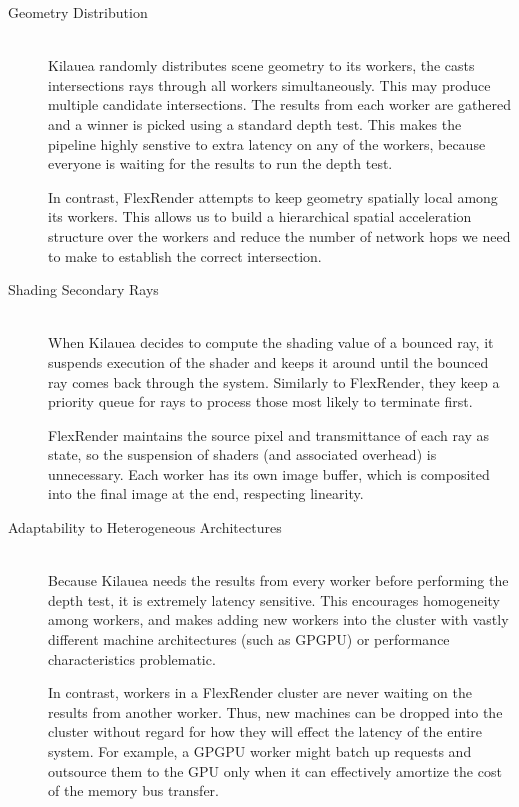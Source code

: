 \documentclass[12pt]{ucthesis}
\begin{document}
\begin{description}
    \item[Geometry Distribution] \hfill \\
        Kilauea randomly distributes scene geometry to
        its workers, the casts intersections rays through all workers
        simultaneously. This may produce multiple candidate intersections. The
        results from each worker are gathered and a winner is picked using a
        standard depth test. This makes the pipeline highly senstive to extra
        latency on any of the workers, because everyone is waiting for the
        results to run the depth test.

        In contrast, FlexRender attempts to keep geometry spatially local among
        its workers. This allows us to build a hierarchical spatial acceleration
        structure over the workers and reduce the number of network hops we need
        to make to establish the correct intersection.
    \item[Shading Secondary Rays] \hfill \\
        When Kilauea decides to compute the shading value of a bounced ray, it
        suspends execution of the shader and keeps it around until the bounced
        ray comes back through the system. Similarly to FlexRender, they keep
        a priority queue for rays to process those most likely to terminate
        first.

        FlexRender maintains the source pixel and transmittance of each ray as
        state, so the suspension of shaders (and associated overhead) is
        unnecessary. Each worker has its own image buffer, which is composited
        into the final image at the end, respecting linearity.
    \item[Adaptability to Heterogeneous Architectures] \hfill \\
        Because Kilauea needs the results from every worker before performing
        the depth test, it is extremely latency sensitive. This encourages
        homogeneity among workers, and makes adding new workers into the cluster
        with vastly different machine architectures (such as GPGPU) or performance
        characteristics problematic.

        In contrast, workers in a FlexRender cluster are never waiting on
        the results from another worker. Thus, new machines can be dropped into the
        cluster without regard for how they will effect the latency of the entire
        system. For example, a GPGPU worker might batch up requests and outsource
        them to the GPU only when it can effectively amortize the cost of the
        memory bus transfer.
\end{description}
\end{document}
